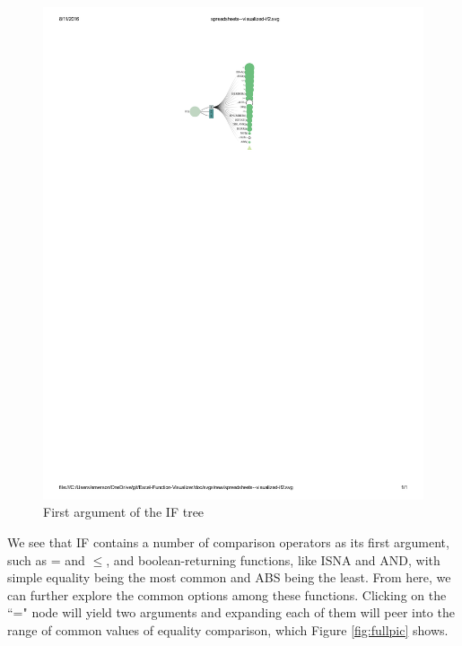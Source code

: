 \documentclass[conference]{IEEEtran}
\begin{document}
	\begin{figure}[h] \centering \includegraphics[scale=.4]{IFexpand}
		\caption{First argument of the IF tree} \label{fig:expandif} \end{figure}
	
	We see that IF contains a number of comparison operators as its first argument,
	such as = and $\le$, and boolean-returning functions, like ISNA and AND, with
	simple equality being the most common and ABS being the least. From here, we
	can further explore the common options among these functions. Clicking on the
	``=" node will yield two arguments and expanding each of them will peer into
	the range of common values of equality comparison, which Figure
	\ref{fig:fullpic} shows. \par
	
\end{document}
